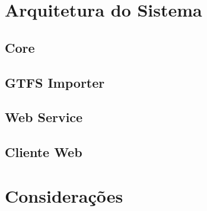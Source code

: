 \section{Arquitetura do Sistema}

\subsection{Core}

\subsection{GTFS Importer}

\subsection{Web Service}

\subsection{Cliente Web}

\section{Considerações}

